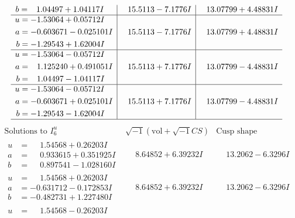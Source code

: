 \documentclass[1p]{elsarticle_modified}
\theoremstyle{definition}
\newcommand{\I}{\sqrt{-1}}
\begin{document}
$$\begin{array}{c|c|c}
\begin{aligned}
b &= \phantom{-}1.04497 + 1.04117 I\end{aligned}
 & \phantom{-}15.5113 - 7.1776 I & \phantom{-}13.07799 + 4.48831 I \\ \hline\begin{aligned}
u &= -1.53064 + 0.05712 I \\
a &= -0.603671 - 0.025101 I \\
b &= -1.29543 + 1.62004 I\end{aligned}
 & \phantom{-}15.5113 - 7.1776 I & \phantom{-}13.07799 + 4.48831 I \\ \hline\begin{aligned}
u &= -1.53064 - 0.05712 I \\
a &= \phantom{-}1.125240 + 0.491051 I \\
b &= \phantom{-}1.04497 - 1.04117 I\end{aligned}
 & \phantom{-}15.5113 + 7.1776 I & \phantom{-}13.07799 - 4.48831 I \\ \hline\begin{aligned}
u &= -1.53064 - 0.05712 I \\
a &= -0.603671 + 0.025101 I \\
b &= -1.29543 - 1.62004 I\end{aligned}
 & \phantom{-}15.5113 + 7.1776 I & \phantom{-}13.07799 - 4.48831 I\\
 \hline 
 \end{array}$$\newpage$$\begin{array}{c|c|c}  
\text{Solutions to }I^u_{6}& \I (\text{vol} + \sqrt{-1}CS) & \text{Cusp shape}\\
 \hline 
\begin{aligned}
u &= \phantom{-}1.54568 + 0.26203 I \\
a &= \phantom{-}0.933615 + 0.351925 I \\
b &= \phantom{-}0.897541 - 1.028160 I\end{aligned}
 & \phantom{-}8.64852 + 6.39232 I & \phantom{-}13.2062 - 6.3296 I \\ \hline\begin{aligned}
u &= \phantom{-}1.54568 + 0.26203 I \\
a &= -0.631712 - 0.172853 I \\
b &= -0.482731 + 1.227480 I\end{aligned}
 & \phantom{-}8.64852 + 6.39232 I & \phantom{-}13.2062 - 6.3296 I \\ \hline\begin{aligned}
u &= \phantom{-}1.54568 - 0.26203 I \\

\end{aligned}
\end{array}$$
\end{document}
